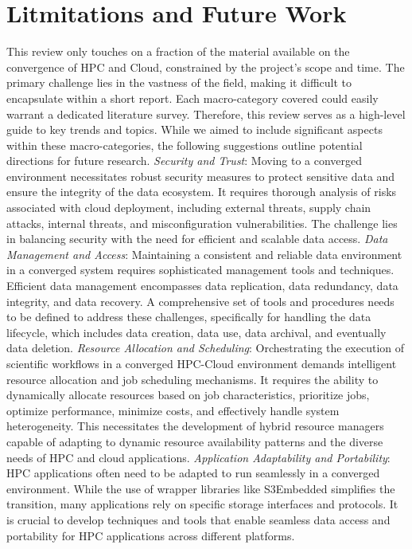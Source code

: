 \section{Litmitations and Future Work}
\label{sec:future}

This review only touches on a fraction of the material available on the convergence of HPC and Cloud, constrained by the project's scope and time. The primary challenge lies in the vastness of the field, making it difficult to encapsulate within a short report. Each macro-category covered could easily warrant a dedicated literature survey. Therefore, this review serves as a high-level guide to key trends and topics. While we aimed to include significant aspects within these macro-categories, the following suggestions outline potential directions for future research.
\newline
\newline
\noindent
\textit{Security and Trust}: Moving to a converged environment necessitates robust security measures to protect sensitive data and ensure the integrity of the data ecosystem. It requires thorough analysis of risks associated with cloud deployment, including external threats, supply chain attacks, internal threats, and misconfiguration vulnerabilities. The challenge lies in balancing security with the need for efficient and scalable data access.
\newline
\newline
\noindent
\textit{Data Management and Access}: Maintaining a consistent and reliable data environment in a converged system requires sophisticated management tools and techniques. Efficient data management encompasses data replication, data redundancy, data integrity, and data recovery. A comprehensive set of tools and
procedures needs to be defined to address these challenges, specifically for handling the data lifecycle, which includes data creation, data use, data archival, and eventually data deletion.
\newline
\newline
\noindent
\textit{Resource Allocation and Scheduling}: Orchestrating the execution of scientific workflows in a converged HPC-Cloud environment demands intelligent resource allocation and job scheduling mechanisms. It requires the ability to dynamically allocate resources based on job characteristics, prioritize jobs, optimize performance, minimize costs, and effectively handle system heterogeneity. This necessitates the development of hybrid resource managers capable of adapting to dynamic resource availability patterns and the diverse needs of HPC and cloud applications.
\newline
\newline
\noindent
\textit{Application Adaptability and Portability}: HPC applications often need to be adapted to run seamlessly in a converged environment. While the use of wrapper libraries like S3Embedded simplifies the transition, many applications rely on specific storage interfaces and protocols. It is crucial to develop techniques and tools that enable seamless data access and portability for HPC applications across different platforms. \\

